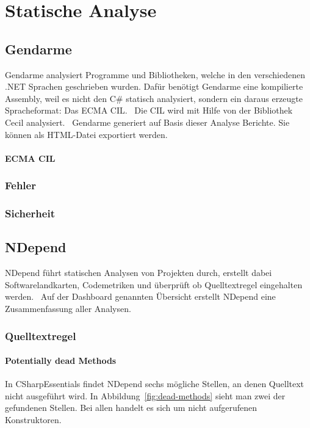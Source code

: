 %
\section{Statische Analyse}

\subsection{Gendarme}
Gendarme analysiert Programme und Bibliotheken, welche in den verschiedenen .NET Sprachen geschrieben wurden. Dafür benötigt Gendarme eine kompilierte Assembly, weil es nicht den C\# statisch analysiert, sondern ein daraus erzeugte Spracheformat: Das ECMA CIL.~\cite{ecma} Die CIL wird mit Hilfe von der Bibliothek Cecil analysiert.~\cite{cecil} Gendarme generiert auf Basis dieser Analyse Berichte. Sie können als HTML-Datei exportiert werden.

\paragraph{ECMA CIL}

\subsubsection{Fehler}

\subsubsection{Sicherheit}


\subsection{NDepend}
NDepend führt statischen Analysen von Projekten durch, erstellt dabei Softwarelandkarten, Codemetriken und überprüft ob Quelltextregel eingehalten werden.~\cite{ndepend} Auf der Dashboard genannten Übersicht erstellt NDepend eine Zusammenfassung aller Analysen.

\subsubsection{Quelltextregel}

\paragraph{Potentially dead Methods} In CSharpEssentials findet NDepend sechs mögliche Stellen, an denen Quelltext nicht ausgeführt wird. In Abbildung~\ref{fig:dead-methods} sieht man zwei der gefundenen Stellen. Bei allen handelt es sich um nicht aufgerufenen Konstruktoren. 

